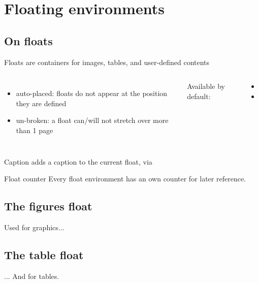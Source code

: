 \section{Floating environments}
\subsection{On floats}
\begin{frame}
	Floats are containers for images, tables, and user-defined contents
	\begin{columns}[c]
	\begin{itemize}
		\item auto-placed: floats do not appear at the position they are
			defined
		\item un-broken: a float can/will not stretch over more than 1
			page
	\end{itemize}
	Available by default: 
	\begin{itemize}
		\item {}
		\item {}
	\end{itemize}
	\end{columns}
\end{frame}

\begin{frame}
	\begin{block}{Caption}
		 adds a caption to the current float, via
	\end{block}

	\begin{block}{Float counter}
		Every float environment has an own counter for later reference.
	\end{block}
\end{frame}

\subsection{The figures float}
\begin{frame}
	Used for graphics...
\end{frame}


\subsection{The table float}
\begin{frame}
	... And for tables.
\end{frame}

